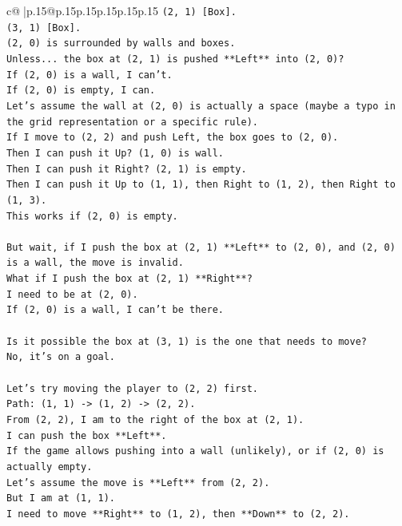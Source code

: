 \documentclass{article}
\begin{document}
{\begin{supertabular}{c@{$\;$}|p{.15\linewidth}@{}p{.15\linewidth}p{.15\linewidth}p{.15\linewidth}p{.15\linewidth}p{.15\linewidth}}
{{{\texttt{(2, 1) {[}Box{]}.} \\
\texttt{(3, 1) {[}Box{]}.} \\
\texttt{(2, 0) is surrounded by walls and boxes.} \\
\texttt{Unless... the box at (2, 1) is pushed **Left** into (2, 0)?} \\
\texttt{If (2, 0) is a wall, I can't.} \\
\texttt{If (2, 0) is empty, I can.} \\
\texttt{Let's assume the wall at (2, 0) is actually a space (maybe a typo in the grid representation or a specific rule).} \\
\texttt{If I move to (2, 2) and push Left, the box goes to (2, 0).} \\
\texttt{Then I can push it Up? (1, 0) is wall.} \\
\texttt{Then I can push it Right? (2, 1) is empty.} \\
\texttt{Then I can push it Up to (1, 1), then Right to (1, 2), then Right to (1, 3).} \\
\texttt{This works if (2, 0) is empty.} \\
\\ 
\texttt{But wait, if I push the box at (2, 1) **Left** to (2, 0), and (2, 0) is a wall, the move is invalid.} \\
\texttt{What if I push the box at (2, 1) **Right**?} \\
\texttt{I need to be at (2, 0).} \\
\texttt{If (2, 0) is a wall, I can't be there.} \\
\\ 
\texttt{Is it possible the box at (3, 1) is the one that needs to move?} \\
\texttt{No, it's on a goal.} \\
\\ 
\texttt{Let's try moving the player to (2, 2) first.} \\
\texttt{Path: (1, 1) {-}> (1, 2) {-}> (2, 2).} \\
\texttt{From (2, 2), I am to the right of the box at (2, 1).} \\
\texttt{I can push the box **Left**.} \\
\texttt{If the game allows pushing into a wall (unlikely), or if (2, 0) is actually empty.} \\
\texttt{Let's assume the move is **Left** from (2, 2).} \\
\texttt{But I am at (1, 1).} \\
\texttt{I need to move **Right** to (1, 2), then **Down** to (2, 2).} \\
}}}
\end{supertabular}}
\end{document}
